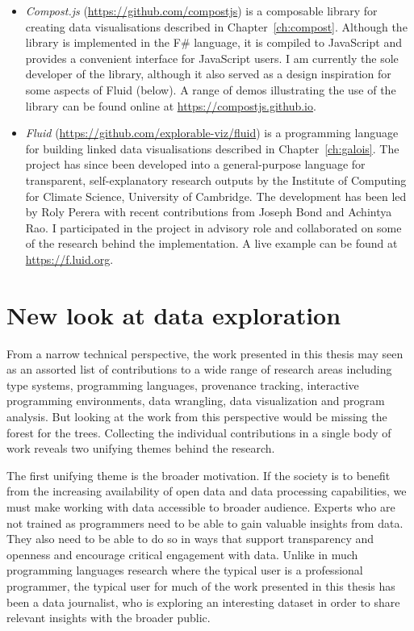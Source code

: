 \documentclass[fleqn,11pt]{report}
\theoremstyle{definition}
\newenvironment{nitemize}
{ \vspace{-0.4em}
  \begin{itemize}
    \setlength{\itemsep}{5pt}
    \setlength{\parskip}{0pt}
    \setlength{\parsep}{0pt} }
{ \end{itemize}
  \vspace{-0.4em} }
\begin{document}
\begin{nitemize}
  \item \emph{Compost.js} (\url{https://github.com/compostjs}) is a composable library for creating
    data visualisations described in Chapter~\ref{ch:compost}. Although the library is implemented
    in the F\# language, it is compiled to JavaScript and provides a convenient interface for
    Java\-Script users. I am currently the sole developer of the library, although it also served
    as a design inspiration for some aspects of Fluid (below). A range of demos illustrating the
    use of the library can be found online at
    \url{https://compostjs.github.io}.

  \item \emph{Fluid} (\url{https://github.com/explorable-viz/fluid}) is a programming language
    for building linked data visualisations described in Chapter~\ref{ch:galois}. The project has
    since been developed into a general-purpose language for transparent, self-explanatory research
    outputs by the Institute of Computing for Climate Science, University of Cambridge. The
    development has been led by Roly Perera with recent contributions from Joseph Bond and
    Achintya Rao. I participated in the project in advisory role and collaborated on some of the
    research behind the implementation. A live example can be found at \url{https://f.luid.org}.
\end{nitemize}

\section{New look at data exploration}
\label{ch:concls}

From a narrow technical perspective, the work presented in this thesis may seen as
an assorted list of contributions to a wide range of research areas including type systems,
programming languages, provenance tracking, interactive programming environments, data wrangling,
data visualization and program analysis. But looking at the work from this perspective would be
missing the forest for the trees. Collecting the individual contributions in
a single body of work reveals two unifying themes behind the research.

The first unifying theme is the broader motivation. If the society is to benefit from the
increasing availability of open data and data processing capabilities, we must make working
with data accessible to broader audience. Experts who are not trained as programmers need to
be able to gain valuable insights from data. They also need to be able to do so in ways that
support transparency and openness and encourage critical engagement with data.
Unlike in much programming languages research where the typical user is a professional
programmer, the typical user for much of the work presented in this thesis has been a data
journalist, who is exploring an interesting dataset in order to share relevant insights
with the broader public.
\end{document}
